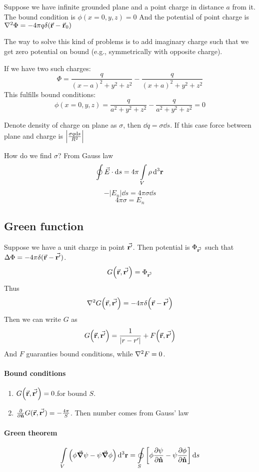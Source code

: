 Suppose we have infinite grounded plane and a point charge in distance $a$ from it. The bound condition is $\phi(x=0,y,z) = 0$ And the potential of point charge is
$\laplacian{\Phi} = -4\pi q \delta \qty(\va{r} - \va{r}_0)$

The way to solve this kind of problems is to add imaginary charge such that we get zero potential on bound (e.g., symmetrically with opposite charge).

If we have two such charges:
$$\Phi = \frac{q}{(x-a)^2+y^2+z^2} -  \frac{q}{(x+a)^2+y^2+z^2}$$
This fulfills bound conditions:
 $$\phi(x=0,y,z) = \frac{q}{a^2+y^2+z^2} -  \frac{q}{a^2+y^2+z^2}= 0$$
 
 Denote density of charge on plane as $\sigma$, then $\dd{q} = \sigma \dd{s}$. If this case force between plane and charge is $\abs{\frac{\sigma q \dd{s}}{R^2}}$
 
 How do we find $\sigma$? From Gauss law
 $$\oint \vec{E} \cdot \dd{s} = 4\pi \int\limits_V \rho \dd[3]{\vb{r}}$$
 $$-|E_n|\dd{s} = 4\pi \sigma \dd{s}$$
 $$4\pi \sigma = E_n$$
 
 \subsection{Green function}
 Suppose we have a unit charge in point $\va{r'}$. Then potential is $\Phi_{\va{r'}}$ such that $\Delta \Phi = -4\pi \delta (\va{r} - \va{r'}) $.
 $$G\qty(\va{r}, \va{r'}) = \Phi_{\va{r'}}$$
 Thus
 $$ \laplacian{G\qty(\va{r}, \va{r'})} = -4\pi \delta \qty(\va{r} - \va{r'}) $$
 Then we can write $G$ as
 $$G\qty(\va{r}, \va{r'} ) = \frac{1}{\abs{r-r'}} + F\qty(\va{r}, \va{r'} )$$ 
 And $F$ guaranties bound conditions, while $ \laplacian{F} = 0$.
 
 \paragraph{Bound conditions}
 \begin{enumerate}
 	\item $G\qty(\va{r}, \va{r'}) = 0$.for bound $S$.
 	\item $ \pdv{\vu{n}}G(\va{r}, \va{r'}) = -\frac{4\pi}{S} $. Then number comes from Gauss' law
 \end{enumerate}

\paragraph{Green theorem}
$$\int\limits_V \left( \phi \grad{\psi} - \psi  \grad{\phi} \right) \dd[3]{\vb{r}} = \oint\limits_S \left[ \phi \pdv{\psi}{ \vu{n}} - \psi \pdv{\phi}{ \vu{n}} \right]\dd{s} $$

